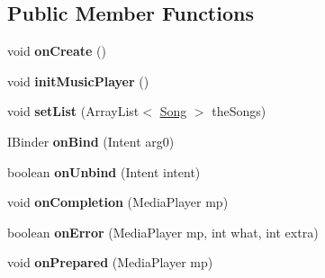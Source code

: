 \subsection*{Public Member Functions}
\begin{DoxyCompactItemize}
\item 
\hypertarget{classcom_1_1chopin_1_1MusicService_aa1ff15c5f6f8be8e776ed950e9c0df7c}{}void {\bfseries on\+Create} ()\label{classcom_1_1chopin_1_1MusicService_aa1ff15c5f6f8be8e776ed950e9c0df7c}

\item 
\hypertarget{classcom_1_1chopin_1_1MusicService_acf884fbbfba22327e684c7f1bbc9a680}{}void {\bfseries init\+Music\+Player} ()\label{classcom_1_1chopin_1_1MusicService_acf884fbbfba22327e684c7f1bbc9a680}

\item 
\hypertarget{classcom_1_1chopin_1_1MusicService_ad5b53ad2e0130fa4f1378a57820a2b32}{}void {\bfseries set\+List} (Array\+List$<$ \hyperlink{classcom_1_1chopin_1_1Song}{Song} $>$ the\+Songs)\label{classcom_1_1chopin_1_1MusicService_ad5b53ad2e0130fa4f1378a57820a2b32}

\item 
\hypertarget{classcom_1_1chopin_1_1MusicService_ace5083ece383284817ee86ad52cbadfd}{}I\+Binder {\bfseries on\+Bind} (Intent arg0)\label{classcom_1_1chopin_1_1MusicService_ace5083ece383284817ee86ad52cbadfd}

\item 
\hypertarget{classcom_1_1chopin_1_1MusicService_a0bfdf09a4912089254e7d9bcca31a5c3}{}boolean {\bfseries on\+Unbind} (Intent intent)\label{classcom_1_1chopin_1_1MusicService_a0bfdf09a4912089254e7d9bcca31a5c3}

\item 
\hypertarget{classcom_1_1chopin_1_1MusicService_acb6e4da174fdadfbbf09e06fb7144db4}{}void {\bfseries on\+Completion} (Media\+Player mp)\label{classcom_1_1chopin_1_1MusicService_acb6e4da174fdadfbbf09e06fb7144db4}

\item 
\hypertarget{classcom_1_1chopin_1_1MusicService_ad2e786c061d8f06800a3c93a2496dac6}{}boolean {\bfseries on\+Error} (Media\+Player mp, int what, int extra)\label{classcom_1_1chopin_1_1MusicService_ad2e786c061d8f06800a3c93a2496dac6}

\item 
\hypertarget{classcom_1_1chopin_1_1MusicService_a1f4838d19b85ccff29c3bf1c9548efcf}{}void {\bfseries on\+Prepared} (Media\+Player mp)\label{classcom_1_1chopin_1_1MusicService_a1f4838d19b85ccff29c3bf1c9548efcf}


\end{DoxyCompactItemize}
